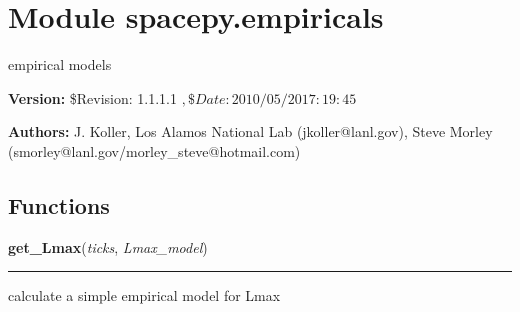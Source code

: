 %
%
%


\section{Module spacepy.empiricals}

    \label{spacepy:empiricals}
empirical models

\textbf{Version:} \$Revision: 1.1.1.1 $, \$Date: 2010/05/20 17:19:45 $



\textbf{Authors:}
J. Koller, Los Alamos National Lab (jkoller@lanl.gov),
    Steve Morley (smorley@lanl.gov/morley\_steve@hotmail.com)



  \subsection{Functions}

    \label{spacepy:empiricals:get_Lmax}

    \vspace{0.5ex}

\hspace{.8\funcindent}\begin{boxedminipage}{\funcwidth}

    \raggedright \textbf{get\_Lmax}(\textit{ticks}, \textit{Lmax\_model})

    \vspace{-1.5ex}

    \rule{\textwidth}{0.5\fboxrule}
\setlength{\parskip}{2ex}
    calculate a simple empirical model for Lmax

\setlength{\parskip}{1ex}
    \end{boxedminipage}

